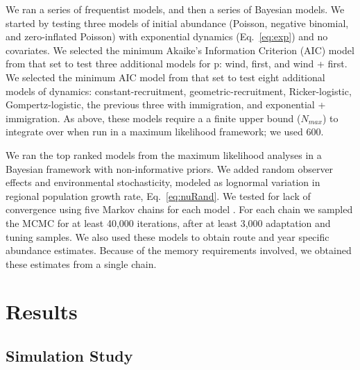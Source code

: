 \documentclass[12pt]{article}
\begin{document}
We ran a series of frequentist models, 
and then a series of Bayesian models. We started by testing
three models of initial abundance (Poisson, negative binomial, and
zero-inflated Poisson) with exponential dynamics
(Eq.~\ref{eq:exp}) and no covariates.  We selected the minimum Akaike's Information
Criterion (AIC) model from that set to test three additional
models for p: wind, first, and wind + first. We selected the minimum
AIC model from that set to test eight additional models of dynamics:
constant-recruitment, geometric-recruitment, Ricker-logistic, Gompertz-logistic, 
the previous three with immigration, and exponential + immigration.
As above, these models require a a finite upper bound ($N_{max}$) to integrate
over when run in a maximum likelihood
framework; we used 600. %

We ran the top ranked models from the maximum likelihood
analyses in a Bayesian framework with non-informative priors.  We added random observer 
effects and environmental stochasticity, modeled as lognormal
variation in regional population growth rate, Eq.~\ref{eq:nuRand}. %
We tested for lack of convergence using
five Markov chains for each model \citep{gelman_rubin:1992}.
For each chain we sampled the MCMC for at least 40,000 iterations, after at
least 3,000 adaptation and tuning samples.  
We also used these models to obtain route and 
year specific abundance estimates.  Because of the memory requirements involved,
we obtained these estimates from a single chain.  %

\section{Results}

\subsection{Simulation Study}
\end{document}
